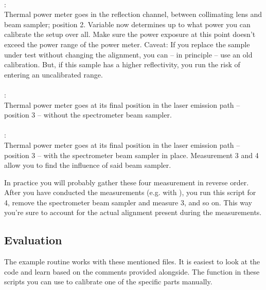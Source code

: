 \paragraph{}:\\
Thermal power meter goes in the reflection channel,
between collimating lens and beam sampler; position 2.
Variable  now determines
up to what power you can calibrate the setup over all.
Make sure the power exposure at this point
doesn't exceed the power range of the power meter.
Caveat:
If you replace the sample under test
without changing the alignment,
you can -- in principle -- use an old calibration.
But, if this sample has a higher reflectivity,
you run the risk of entering an uncalibrated range.

\paragraph{}:\\
Thermal power meter goes
at its final position in the laser emission path --
position 3 --
without the spectrometer beam sampler.

\paragraph{}:\\
Thermal power meter goes
at its final position in the laser emission path --
position 3 --
with the spectrometer beam sampler in place.
Measurement 3 and 4 allow you to find the influence of said beam sampler.

In practice you will probably gather these four measurement in reverse order.
After you have conducted the measurements
(e.g. with ),
you run this script for 4,
remove the spectrometer beam sampler and measure 3,
and so on.
This way you're sure
to account for the actual alignment
present during the measurements.


\subsection{Evaluation}

The example routine 
works with these mentioned files.
It is easiest to look at the code
and learn based on the comments
provided alongside.
The  function
in these scripts
you can use
to calibrate one of the specific parts manually.
